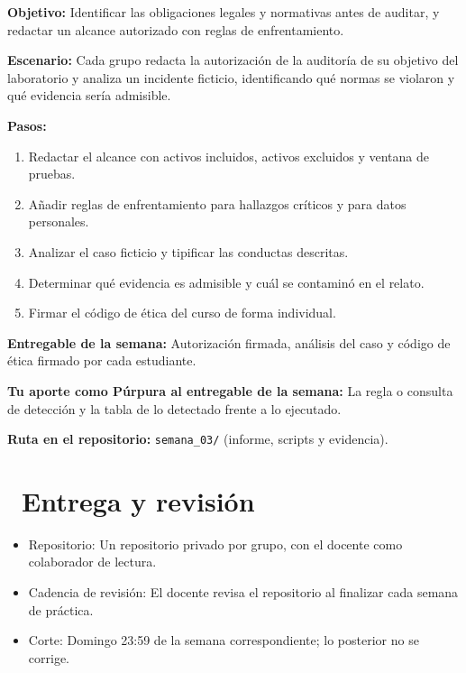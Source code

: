\documentclass[11pt,a4paper]{article}
\newcommand{\iconotexto}[2]{\textcolor{cyanNeon}{\faIcon{#1}}~#2}
\begin{document}
\begin{tcolorbox}[cajaContenido,title={Semana 3 --- Carta de autorización y análisis de caso}]
\textbf{Objetivo:} Identificar las obligaciones legales y normativas antes de auditar, y redactar un alcance autorizado con reglas de enfrentamiento.

\textbf{Escenario:} Cada grupo redacta la autorización de la auditoría de su objetivo del laboratorio y analiza un incidente ficticio, identificando qué normas se violaron y qué evidencia sería admisible.


\textbf{Pasos:}
\begin{enumerate}[leftmargin=1.4em,itemsep=2pt,topsep=3pt]
  \item Redactar el alcance con activos incluidos, activos excluidos y ventana de pruebas.
  \item Añadir reglas de enfrentamiento para hallazgos críticos y para datos personales.
  \item Analizar el caso ficticio y tipificar las conductas descritas.
  \item Determinar qué evidencia es admisible y cuál se contaminó en el relato.
  \item Firmar el código de ética del curso de forma individual.
\end{enumerate}
\textbf{Entregable de la semana:} Autorización firmada, análisis del caso y código de ética firmado por cada estudiante.

\textbf{Tu aporte como Púrpura al entregable de la semana:} La regla o consulta de detección y la tabla de lo detectado frente a lo ejecutado.

\textbf{Ruta en el repositorio:} \texttt{semana\_03/} (informe, scripts y evidencia).
\end{tcolorbox}

\section{\iconotexto{code-branch}{Entrega y revisión}}

\begin{itemize}[leftmargin=1.4em,itemsep=2pt,topsep=3pt]
  \item Repositorio: Un repositorio privado por grupo, con el docente como colaborador de lectura.
  \item Cadencia de revisión: El docente revisa el repositorio al finalizar cada semana de práctica.
  \item Corte: Domingo 23:59 de la semana correspondiente; lo posterior no se corrige.
\end{itemize}
\end{document}
